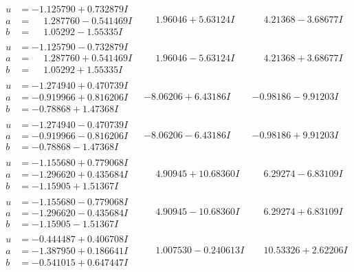 \documentclass[1p]{elsarticle_modified}
\theoremstyle{definition}
\begin{document}
$$\begin{array}{c|c|c}
\begin{aligned}
u &= -1.125790 + 0.732879 I \\
a &= \phantom{-}1.287760 - 0.541469 I \\
b &= \phantom{-}1.05292 - 1.55335 I\end{aligned}
 & \phantom{-}1.96046 + 5.63124 I & \phantom{-}4.21368 - 3.68677 I \\ \hline\begin{aligned}
u &= -1.125790 - 0.732879 I \\
a &= \phantom{-}1.287760 + 0.541469 I \\
b &= \phantom{-}1.05292 + 1.55335 I\end{aligned}
 & \phantom{-}1.96046 - 5.63124 I & \phantom{-}4.21368 + 3.68677 I \\ \hline\begin{aligned}
u &= -1.274940 + 0.470739 I \\
a &= -0.919966 + 0.816206 I \\
b &= -0.78868 + 1.47368 I\end{aligned}
 & -8.06206 + 6.43186 I & -0.98186 - 9.91203 I \\ \hline\begin{aligned}
u &= -1.274940 - 0.470739 I \\
a &= -0.919966 - 0.816206 I \\
b &= -0.78868 - 1.47368 I\end{aligned}
 & -8.06206 - 6.43186 I & -0.98186 + 9.91203 I \\ \hline\begin{aligned}
u &= -1.155680 + 0.779068 I \\
a &= -1.296620 + 0.435684 I \\
b &= -1.15905 + 1.51367 I\end{aligned}
 & \phantom{-}4.90945 + 10.68360 I & \phantom{-}6.29274 - 6.83109 I \\ \hline\begin{aligned}
u &= -1.155680 - 0.779068 I \\
a &= -1.296620 - 0.435684 I \\
b &= -1.15905 - 1.51367 I\end{aligned}
 & \phantom{-}4.90945 - 10.68360 I & \phantom{-}6.29274 + 6.83109 I \\ \hline\begin{aligned}
u &= -0.444487 + 0.406708 I \\
a &= -1.387950 + 0.186641 I \\
b &= -0.541015 + 0.647447 I\end{aligned}
 & \phantom{-}1.007530 - 0.240613 I & \phantom{-}10.53326 + 2.62206 I \\ \hline\begin{aligned}

\end{aligned}
\end{array}$$
\end{document}
